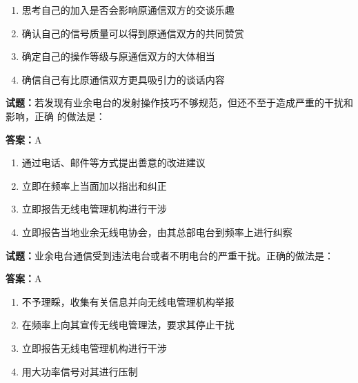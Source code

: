 \documentclass{ctexbook}
\begin{document}
\begin{enumerate}[leftmargin=3em]
  \item 思考自己的加入是否会影响原通信双方的交谈乐趣 

  \item 确认自己的信号质量可以得到原通信双方的共同赞赏 

  \item 确定自己的操作等级与原通信双方的大体相当 

  \item 确信自己有比原通信双方更具吸引力的谈话内容 

\end{enumerate}





\vspace{1em}

\textbf{试题：}若发现有业余电台的发射操作技巧不够规范，但还不至于造成严重的干扰和影响，正确
的做法是： 

\textbf{答案：}A 

\begin{enumerate}[leftmargin=3em]
  \item 通过电话、邮件等方式提出善意的改进建议 

  \item 立即在频率上当面加以指出和纠正 

  \item 立即报告无线电管理机构进行干涉 

  \item 立即报告当地业余无线电协会，由其总部电台到频率上进行纠察 

\end{enumerate}





\vspace{1em}

\textbf{试题：}业余电台通信受到违法电台或者不明电台的严重干扰。正确的做法是： 

\textbf{答案：}A 

\begin{enumerate}[leftmargin=3em]
  \item 不予理睬，收集有关信息并向无线电管理机构举报 

  \item 在频率上向其宣传无线电管理法，要求其停止干扰 

  \item 立即报告无线电管理机构进行干涉 

  \item 用大功率信号对其进行压制 

\end{enumerate}
\end{document}
